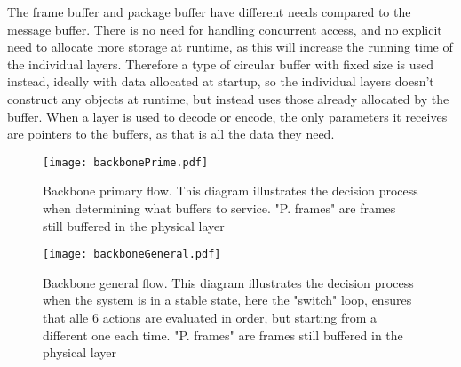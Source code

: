 The frame buffer and package buffer have different needs compared to the message buffer. There is no need for handling concurrent access, and no explicit need to allocate more storage at runtime, as this will increase the running time of the individual layers.
Therefore a type of circular buffer with fixed size is used instead, ideally with data allocated at startup, so the individual layers doesn't construct any objects at runtime, but instead uses those already allocated by the buffer.
When a layer is used to decode or encode, the only parameters it receives are pointers to the buffers, as that is all the data they need.

\begin{figure}[htb]
	\begin{center}
	\texttt{[image: backbonePrime.pdf]}
	\caption{Backbone primary flow. This diagram illustrates the decision process when determining what buffers to service. "P. frames" are frames still buffered in the physical layer}
	\label{fig:backboneprime}	
	\end{center}
\end{figure}

\begin{figure}[htb]
	\begin{center}
	\texttt{[image: backboneGeneral.pdf]}
	\caption{Backbone general flow. This diagram illustrates the decision process when the system is in a stable state, here the "switch" loop, ensures that alle 6 actions are evaluated in order, but starting from a different one each time. "P. frames" are frames still buffered in the physical layer}
	\label{fig:backbonegeneral}	
	\end{center}
\end{figure}

